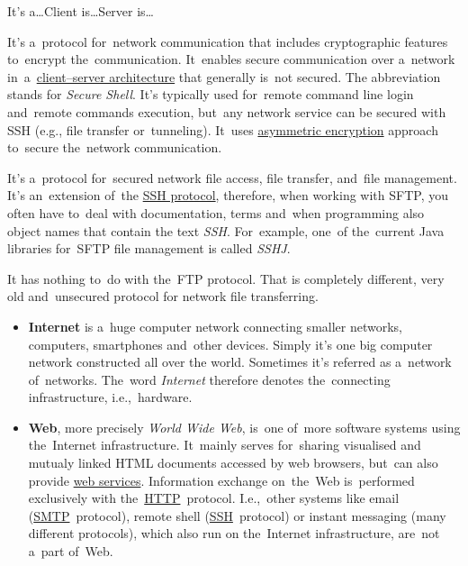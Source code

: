 \label{clientserverarchitecture}
\todo It's a\dots Client is\dots Server is\dots


\label{tcp}

\label{ip}

\label{http}

\label{smtp}

\label{ssh}
It's a~protocol for~network communication that includes cryptographic features to~encrypt the~communication. It~enables secure communication over a~network in~a~\hyperref[clientserverarchitecture]{client--server architecture} that generally is~not secured. The abbreviation stands for \textit{Secure Shell}. It's typically used for~remote command line login and~remote commands execution, but~any network service can be secured with SSH (e.g., file transfer or~tunneling). It~uses \hyperref[asymmetricencryption]{asymmetric encryption} approach to~secure the~network communication.

\label{sftp}
It's a~protocol for~secured network file access, file transfer, and~file management. It's an~extension of~the \hyperref[ssh]{SSH protocol}, therefore, when working with SFTP, you often have to~deal with documentation, terms and~when programming also object names that contain the text \textit{SSH}. For~example, one~of the~current Java libraries for~SFTP file management is called \textit{SSHJ}.

\warning It has nothing to~do with the~FTP protocol. That is completely different, very old and~unsecured protocol for network file transferring.

\label{internetweb}
\begin{itemize}
    \item \textbf{Internet} is a~huge computer network connecting smaller networks, computers, smartphones and~other devices. Simply it's one big computer network constructed all over the world. Sometimes it's referred as a~network of~networks. The~word \textit{Internet} therefore denotes the~connecting infrastructure, i.e.,~hardware.
    \item \textbf{Web}, more precisely \textit{World Wide Web}, is~one of~more software systems using the~Internet infrastructure. It~mainly serves for~sharing visualised and mutualy linked HTML documents accessed by web browsers, but~can also provide \hyperref[webservice]{web services}. Information exchange on~the~Web is~performed exclusively with the~\hyperref[http]{HTTP}~protocol. I.e.,~other systems like email (\hyperref[smtp]{SMTP}~protocol), remote shell (\hyperref[ssh]{SSH}~protocol) or instant messaging (many different protocols), which also run on the~Internet infrastructure, are~not a~part of~Web.
\end{itemize}

